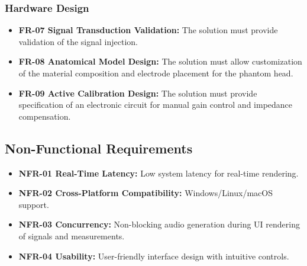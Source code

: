 \documentclass[../00_Main.tex]{subfiles}
\begin{document}
\subsubsection{Hardware Design}
\begin{itemize}
    \item \textbf{FR-07 Signal Transduction Validation:} The solution must provide validation of the signal injection.
    \item \textbf{FR-08 Anatomical Model Design:} The solution must allow customization of the material composition and electrode placement for the phantom head.
    \item \textbf{FR-09 Active Calibration Design:} The solution must provide specification of an electronic circuit for manual gain control and impedance compensation.
\end{itemize}

\subsection{Non-Functional Requirements}\label{subsec:non_func_reqs}
\begin{itemize}
    \item \textbf{NFR-01 Real-Time Latency:} Low system latency for real-time rendering.
    \item \textbf{NFR-02 Cross-Platform Compatibility:} Windows/Linux/macOS support.
    \item \textbf{NFR-03 Concurrency:} Non-blocking audio generation during UI rendering of signals and measurements.
    \item \textbf{NFR-04 Usability:} User-friendly interface design with intuitive controls.
\end{itemize}


\biblio~%
\end{document}
